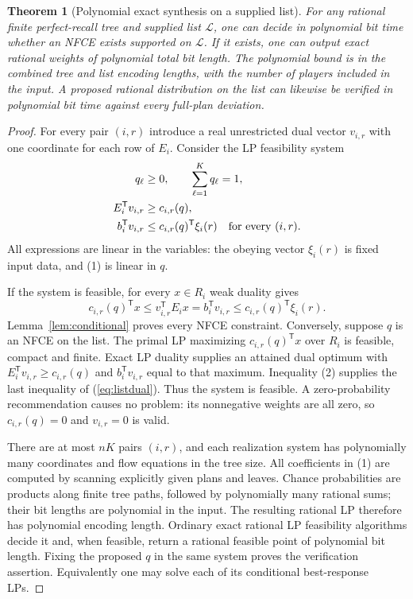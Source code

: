 \documentclass[11pt]{article}
\newtheorem{theorem}{Theorem}
\theoremstyle{definition}
\begin{document}
\begin{theorem}[Polynomial exact synthesis on a supplied list]\label{thm:list}
For any rational finite perfect-recall tree and supplied list $\mathcal L$,
one can decide in polynomial bit time whether an NFCE exists supported on
$\mathcal L$. If it exists, one can output exact rational weights of
polynomial total bit length. The polynomial bound is in the combined tree
and list encoding lengths, with the number of players included in the input.
A proposed rational distribution on the list can likewise be verified in
polynomial bit time against every full-plan deviation.
\end{theorem}
\begin{proof}
For every pair $(i,r)$ introduce a real unrestricted dual vector
$v_{i,r}$ with one coordinate for each row of $E_i$. Consider the LP
feasibility system
\begin{align}
 q_\ell&\geq0,\qquad \sum_{\ell=1}^{K}q_\ell=1,\notag\\
 E_i^{\mathsf T}v_{i,r}&\geq c_{i,r}(q),\label{eq:listdual}\\
 b_i^{\mathsf T}v_{i,r}&\leq
             c_{i,r}(q)^{\mathsf T}\xi_i(r)
             \quad\text{for every }(i,r).\notag
\end{align}
All expressions are linear in the variables: the obeying vector $\xi_i(r)$
is fixed input data, and (1) is linear in $q$.

If the system is feasible, for every $x\in R_i$ weak duality gives
\[
 c_{i,r}(q)^{\mathsf T}x
 \leq v_{i,r}^{\mathsf T}E_i x
 =b_i^{\mathsf T}v_{i,r}
 \leq c_{i,r}(q)^{\mathsf T}\xi_i(r).
\]
Lemma~\ref{lem:conditional} proves every NFCE constraint. Conversely, suppose
$q$ is an NFCE on the list. The primal LP maximizing $c_{i,r}(q)^{\mathsf T}x$
over $R_i$ is feasible, compact and finite. Exact LP duality supplies an
attained dual optimum with $E_i^{\mathsf T}v_{i,r}\geq c_{i,r}(q)$ and
$b_i^{\mathsf T}v_{i,r}$ equal to that maximum. Inequality (2) supplies the
last inequality of (\ref{eq:listdual}). Thus the system is feasible.
A zero-probability recommendation causes no problem: its nonnegative weights
are all zero, so $c_{i,r}(q)=0$ and $v_{i,r}=0$ is valid.

There are at most $nK$ pairs $(i,r)$, and each realization system has
polynomially many coordinates and flow equations in the tree size.
All coefficients in (1) are computed by scanning explicitly given plans and
leaves. Chance probabilities are products along finite tree paths, followed
by polynomially many rational sums; their bit lengths are polynomial in the
input. The resulting rational LP therefore has polynomial encoding length.
Ordinary exact rational LP feasibility algorithms decide it and, when
feasible, return a rational feasible point of polynomial bit length.
Fixing the proposed $q$ in the same system proves the verification assertion.
Equivalently one may solve each of its conditional best-response LPs.
\end{proof}
\end{document}
